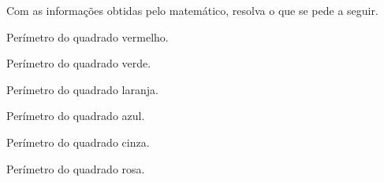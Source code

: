 Com as informações obtidas pelo matemático, resolva o que se pede a seguir.

\begin{escolha}[itemsep=0pt]
\item Perímetro do quadrado vermelho.
        


\item Perímetro do quadrado verde.
        


\item Perímetro do quadrado laranja.
        


\item Perímetro do quadrado azul.
        


\item Perímetro do quadrado cinza.
        


\item Perímetro do quadrado rosa.
        


\end{escolha}


